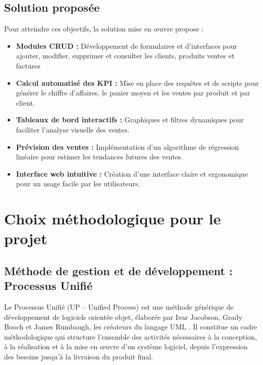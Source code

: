 \subsection{Solution proposée}

Pour atteindre ces objectifs, la solution mise en œuvre propose :

\begin{itemize}[leftmargin=*, noitemsep]
    \item \textbf{Modules CRUD :}
    Développement de formulaires et d'interfaces pour ajouter, modifier, supprimer
    et consulter les clients, produits ventes et factures

    \item \textbf{Calcul automatisé des KPI :}
    Mise en place des requêtes et de scripts pour générer le chiffre d'affaires,
    le panier moyen et les ventes par produit et par client.

    \item \textbf{Tableaux de bord interactifs :}
    Graphiques et filtres dynamiques pour faciliter l'analyse visuelle des ventes.

    \item \textbf{Prévision des ventes :}
    Implémentation d'un algorithme de régression linéaire pour estimer les
    tendances futures des ventes.

    \item \textbf{Interface web intuitive :}
    Création d'une interface claire et ergonomique pour un usage facile
    par les utilisateurs.
\end{itemize}

\section{Choix méthodologique pour le projet}

\subsection{Méthode de gestion et de développement : Processus Unifié}

Le Processus Unifié (UP -- Unified Process) est une méthode générique de
développement de logiciels orientée objet, élaborée par Ivar Jacobson, Grady Booch
et James Rumbaugh, les créateurs du langage UML \cite{uml}.
Il constitue un cadre méthodologique qui structure l'ensemble des activités
nécessaires à la conception, à la réalisation et à la mise en œuvre d'un système
logiciel, depuis l'expression des besoins jusqu'à la livraison du produit final.

